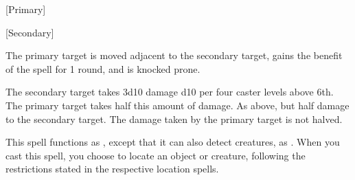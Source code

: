 \begin{spellheader}
    \begin{spelltargetinginfo}
        [Primary]
        \spellrng{\rngclose}
    \end{spelltargetinginfo}
    \begin{spelleffects}
        \begin{spelltargetinginfo}
            [Secondary]
        \end{spelltargetinginfo}
    \end{spelleffects}
\end{spellheader}
\begin{spellcontent}
    \spelleffect The primary target is moved adjacent to the secondary target, gains the benefit of the  spell for 1 round, and is knocked prone.
    \begin{spellmargin}
        \spellsuccess The secondary target takes 3d10 damage \add d10 per four caster levels above 6th. The primary target takes half this amount of damage.
        \spellfailure As above, but half damage to the secondary target. The damage taken by the primary target is not halved.
    \end{spellmargin}
\end{spellcontent}
\begin{spellfooter}

\end{spellfooter}

\begin{spellheader}
\end{spellheader}
\spellrng{\rngext}
\spelleffect This spell functions as , except that it can also detect creatures, as . When you cast this spell, you choose to locate an object or creature, following the restrictions stated in the respective location spells.

